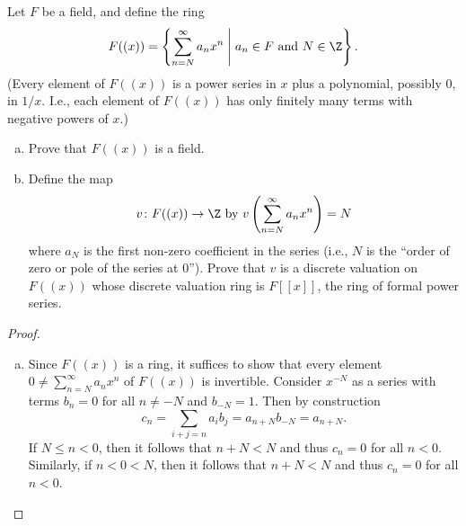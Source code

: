 \documentclass[10pt]{amsart}
\begin{document}
\begin{thm}
  Let $F$ be a field, and define the ring $$F((x)) = \left\{ \sum_{n=N}^\infty a_nx^n \;\middle\vert\; a_n \in F\ \text{and}\ N \in \Z\right\}.$$
  (Every element of $F((x))$ is a power series in $x$ plus a polynomial, possibly 0, in $1/x$.  
  I.e., each element of $F((x))$ has only finitely many terms with negative powers of $x$.)
  \begin{enumerate}[(a)]
  \item
    Prove that $F((x))$ is a field.
  \item
    Define the map 
    $$v \colon F((x)) \rightarrow \Z\ \text{by}\ v\left(\sum_{n=N}^\infty a_nx^n\right) = N$$
    where $a_N$ is the first non-zero coefficient in the series (i.e., $N$ is the ``order of zero or pole of the series at 0'').
    Prove that $v$ is a discrete valuation on $F((x))$ whose discrete valuation ring is $F[[x]]$, the ring of formal power series.
  \end{enumerate}
  \begin{proof}
    \begin{enumerate}[(a)]
    \item
      Since $F((x))$ is a ring, it suffices to show that every element $0 \neq \sum_{n=N}^\infty a_nx^n$ of $F((x))$ is invertible.
      Consider $x^{-N}$ as a series with terms $b_n = 0$ for all $n \neq -N$ and $b_{-N} = 1$.
      Then by construction
      $$c_n = \sum_{i + j = n} a_ib_j = a_{n+N}b_{-N} = a_{n+N}.$$
      If $N \leq n < 0$, then it follows that $n + N < N$ and thus $c_n = 0$ for all $n < 0$.
      Similarly, if $n < 0 < N$, then it follows that $n + N < N$ and thus $c_n = 0$ for all $n < 0$.

\end{enumerate}
\end{proof}
\end{thm}
\end{document}
